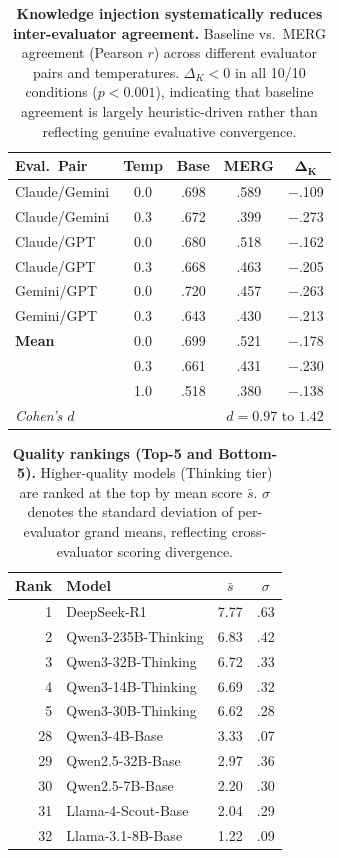 \documentclass{article}
\begin{document}
\begin{table}[t]
\centering
\caption{\textbf{Knowledge injection systematically reduces inter-evaluator agreement.} Baseline vs.\ MERG agreement (Pearson $r$) across different evaluator pairs and temperatures. $\Delta_K < 0$ in all 10/10 conditions ($p < 0.001$), indicating that baseline agreement is largely heuristic-driven rather than reflecting genuine evaluative convergence.}
\label{tab:baseline_vs_merg}
\small
\begin{tabular}{lcccc}
\toprule
\textbf{Eval.\ Pair} & \textbf{Temp} & \textbf{Base} & \textbf{MERG} & $\boldsymbol{\Delta_K}$ \\
\midrule
Claude/Gemini & 0.0 & .698 & .589 & $-$.109 \\
Claude/Gemini & 0.3 & .672 & .399 & $-$.273 \\
Claude/GPT & 0.0 & .680 & .518 & $-$.162 \\
Claude/GPT & 0.3 & .668 & .463 & $-$.205 \\
Gemini/GPT & 0.0 & .720 & .457 & $-$.263 \\
Gemini/GPT & 0.3 & .643 & .430 & $-$.213 \\
\midrule
\textbf{Mean} & 0.0 & .699 & .521 & $-$.178 \\
 & 0.3 & .661 & .431 & $-$.230 \\
 & 1.0 & .518 & .380 & $-$.138 \\
\midrule
\multicolumn{2}{l}{\textit{Cohen's $d$}} & \multicolumn{3}{r}{$d = 0.97$ to $1.42$} \\
\bottomrule
\end{tabular}
\end{table}

\begin{table}[t]
\centering
\caption{\textbf{Quality rankings (Top-5 and Bottom-5).} Higher-quality models (Thinking tier) are ranked at the top by mean score $\bar{s}$. $\sigma$ denotes the standard deviation of per-evaluator grand means, reflecting cross-evaluator scoring divergence.}
\label{tab:quality_ranking}
\small
\begin{tabular}{rlcc}
\toprule
\textbf{Rank} & \textbf{Model} & $\bar{s}$ & $\sigma$ \\
\midrule
1 & DeepSeek-R1 & 7.77 & .63 \\
2 & Qwen3-235B-Thinking & 6.83 & .42 \\
3 & Qwen3-32B-Thinking & 6.72 & .33 \\
4 & Qwen3-14B-Thinking & 6.69 & .32 \\
5 & Qwen3-30B-Thinking & 6.62 & .28 \\
\midrule
28 & Qwen3-4B-Base & 3.33 & .07 \\
29 & Qwen2.5-32B-Base & 2.97 & .36 \\
30 & Qwen2.5-7B-Base & 2.20 & .30 \\
31 & Llama-4-Scout-Base & 2.04 & .29 \\
32 & Llama-3.1-8B-Base & 1.22 & .09 \\
\bottomrule
\end{tabular}
\end{table}
\end{document}
